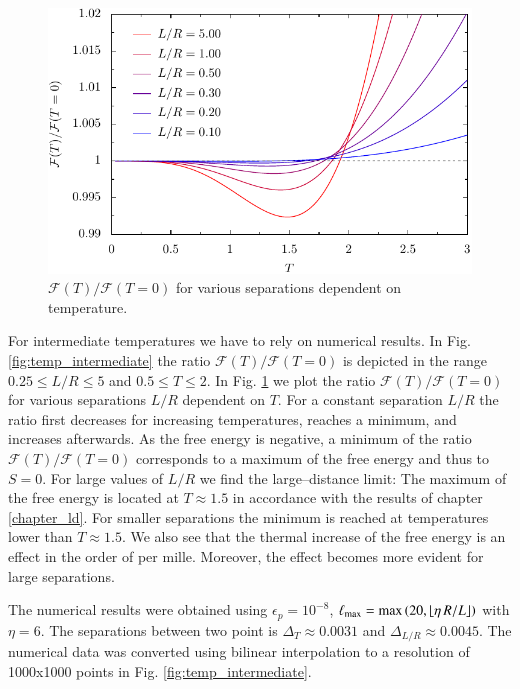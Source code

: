 \begin{figure}
    \begin{center}
    \includegraphics[scale=1]{plots/thermal/thermal.pdf}
    \end{center}

    \caption{$\mathcal{F}(T)/\mathcal{F}(T=0)$ for various separations dependent on temperature.}
    \label{fig:temp_intermediate2}
\end{figure}

For intermediate temperatures we have to rely on numerical results. In Fig.
\ref{fig:temp_intermediate} the ratio $\mathcal{F}(T)/\mathcal{F}(T=0)$ is
depicted in the range $0.25 \le L/R \le 5$ and $0.5 \le T \le 2$. In Fig.
\ref{fig:temp_intermediate2} we plot the ratio
$\mathcal{F}(T)/\mathcal{F}(T=0)$ for various separations $L/R$ dependent on
$T$. For a constant separation $L/R$ the ratio first decreases for increasing temperatures, reaches a minimum,
and increases afterwards. As the free energy is negative, a
minimum of the ratio $\mathcal{F}(T)/\mathcal{F}(T=0)$ corresponds to a maximum of the free energy and thus to
$S=0$. For large values of $L/R$ we find the large--distance limit: The
maximum of the free energy is located at $T\approx1.5$ in accordance with the
results of chapter \ref{chapter_ld}. For smaller separations the minimum is
reached at temperatures lower than $T\approx1.5$. We also see that the thermal increase of the
free energy is an effect in the order of per mille. Moreover, the effect becomes
more evident for large separations.

The numerical results were obtained using $\epsilon_p = 10^{-8}$, ${\ell_\text{max}} =
\max{\left(20, \lfloor \eta \, R/L\rfloor\right)}$ with $\eta=6$. The
separations between two point is $\Delta_T \approx 0.0031$ and $\Delta_{L/R}
\approx 0.0045$.  The numerical data was converted using bilinear interpolation
to a resolution of 1000x1000 points in Fig. \ref{fig:temp_intermediate}.
